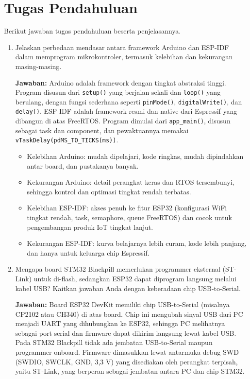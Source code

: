 \section{Tugas Pendahuluan}
Berikut jawaban tugas pendahuluan beserta penjelasannya.
\begin{enumerate}
	\item Jelaskan perbedaan mendasar antara framework Arduino dan ESP-IDF dalam memprogram mikrokontroler, termasuk kelebihan dan kekurangan masing-masing.

	\textbf{Jawaban:} Arduino adalah framework dengan tingkat abstraksi tinggi. Program disusun dari \texttt{setup()} yang berjalan sekali dan \texttt{loop()} yang berulang, dengan fungsi sederhana seperti \texttt{pinMode()}, \texttt{digitalWrite()}, dan \texttt{delay()}. ESP-IDF adalah framework resmi dan native dari Espressif yang dibangun di atas FreeRTOS. Program dimulai dari \texttt{app\_main()}, disusun sebagai task dan component, dan pewaktuannya memakai \texttt{vTaskDelay(pdMS\_TO\_TICKS(ms))}.

	\begin{itemize}
		\item Kelebihan Arduino: mudah dipelajari, kode ringkas, mudah dipindahkan antar board, dan pustakanya banyak.
		\item Kekurangan Arduino: detail perangkat keras dan RTOS tersembunyi, sehingga kontrol dan optimasi tingkat rendah terbatas.
		\item Kelebihan ESP-IDF: akses penuh ke fitur ESP32 (konfigurasi WiFi tingkat rendah, task, semaphore, queue FreeRTOS) dan cocok untuk pengembangan produk IoT tingkat lanjut.
		\item Kekurangan ESP-IDF: kurva belajarnya lebih curam, kode lebih panjang, dan hanya untuk keluarga chip Espressif.
	\end{itemize}

	\item Mengapa board STM32 Blackpill memerlukan programmer eksternal (ST-Link) untuk di-flash, sedangkan ESP32 dapat diprogram langsung melalui kabel USB? Kaitkan jawaban Anda dengan keberadaan chip USB-to-Serial.

	\textbf{Jawaban:} Board ESP32 DevKit memiliki chip USB-to-Serial (misalnya CP2102 atau CH340) di atas board. Chip ini mengubah sinyal USB dari PC menjadi UART yang dihubungkan ke ESP32, sehingga PC melihatnya sebagai port serial dan firmware dapat dikirim langsung lewat kabel USB. Pada STM32 Blackpill tidak ada jembatan USB-to-Serial maupun programmer onboard. Firmware dimasukkan lewat antarmuka debug SWD (SWDIO, SWCLK, GND, 3,3 V) yang disediakan oleh perangkat terpisah, yaitu ST-Link, yang berperan sebagai jembatan antara PC dan chip STM32.


\end{enumerate}
